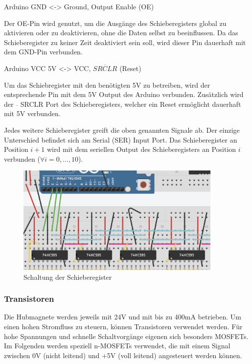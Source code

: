 Arduino GND <-> Ground, Output Enable (OE)

Der OE-Pin wird genutzt, um die Ausgänge des Schieberegisters global zu aktivieren oder zu deaktivieren, ohne die Daten selbst zu beeinflussen.
Da das Schieberegister zu keiner Zeit deaktiviert sein soll, wird dieser Pin dauerhaft mit dem GND-Pin verbunden.

Arduino VCC 5V <-> VCC, $\overline{SRCLR}$ (Reset)

Um das Schiebregister mit den benötigten 5V zu betreiben, wird der entsprechende Pin mit dem 5V Output des Arduino verbunden.
Zusätzlich wird der $\overline{ }$ SRCLR Port des Schieberegisters, welcher ein Reset ermöglicht dauerhaft mit 5V verbunden.

Jedes weitere Schieberegister greift die oben genannten Signale ab.
Der einzige Unterschied befindet sich am Serial (SER) Input Port.
Das Schieberegister an Position $i+1$ wird mit dem seriellen Output des Schieberegisters an Position $i$ verbunden ($\forall i = 0,...,10$).

\begin{figure}[htbp]
	\centering
	\includegraphics[width=0.9\textwidth]{img/SchaltungSchieberegister}
	\caption{Schaltung der Schieberegister}
	\label{fig:Shifting}
\end{figure}

\subsubsection{Transistoren}

Die Hubmagnete werden jeweils mit 24V und mit bis zu 400mA betrieben.
Um einen hohen Stromfluss zu steuern, können Transistoren verwendet werden.
Für hohe Spannungen und schnelle Schaltvorgänge eigenen sich besonders MOSFETs.
Im Folgenden werden speziell n-MOSFETs verwendet, die mit einem Signal zwischen 0V (nicht leitend) und +5V (voll leitend) angesteuert werden können.

